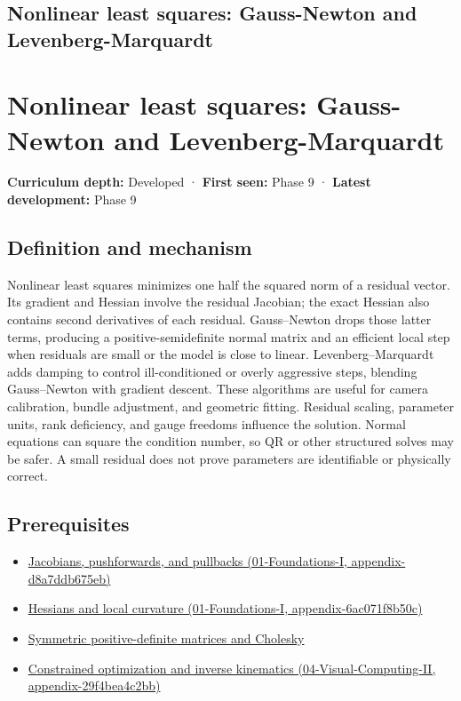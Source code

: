 \hypertarget{appendix-2c2df8345991}{}
\section*{Nonlinear least squares: Gauss-Newton and Levenberg-Marquardt}
\chapter{Nonlinear least squares: Gauss-Newton and Levenberg-Marquardt}\label{appendix-2c2df8345991-nonlinear-least-squares-gauss-newton-and-levenberg-marquardt}

\textbf{Curriculum depth:} Developed · \textbf{First seen:} Phase 9 · \textbf{Latest development:} Phase 9

\section{Definition and mechanism}\label{appendix-2c2df8345991-definition-and-mechanism}

Nonlinear least squares minimizes one half the squared norm of a residual vector. Its gradient and Hessian involve the residual Jacobian; the exact Hessian also contains second derivatives of each residual. Gauss--Newton drops those latter terms, producing a positive-semidefinite normal matrix and an efficient local step when residuals are small or the model is close to linear. Levenberg--Marquardt adds damping to control ill-conditioned or overly aggressive steps, blending Gauss--Newton with gradient descent. These algorithms are useful for camera calibration, bundle adjustment, and geometric fitting. Residual scaling, parameter units, rank deficiency, and gauge freedoms influence the solution. Normal equations can square the condition number, so QR or other structured solves may be safer. A small residual does not prove parameters are identifiable or physically correct.

\section{Prerequisites}\label{appendix-2c2df8345991-prerequisites}

\begin{itemize}
\tightlist
\item
  \href{../01-Foundations-I/main.pdf\#nameddest=appendix-d8a7ddb675eb}{Jacobians, pushforwards, and pullbacks (01-Foundations-I, appendix-d8a7ddb675eb)}
\item
  \href{../01-Foundations-I/main.pdf\#nameddest=appendix-6ac071f8b50c}{Hessians and local curvature (01-Foundations-I, appendix-6ac071f8b50c)}
\item
  \hyperref[appendix-50d2ea3c9b26]{Symmetric positive-definite matrices and Cholesky}
\item
  \href{../04-Visual-Computing-II/main.pdf\#nameddest=appendix-29f4bea4c2bb}{Constrained optimization and inverse kinematics (04-Visual-Computing-II, appendix-29f4bea4c2bb)}
\end{itemize}

